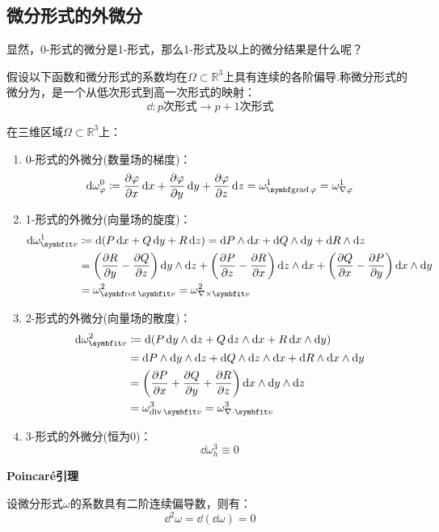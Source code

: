 \subsection{微分形式的外微分}
显然，0-形式的微分是1-形式，那么1-形式及以上的微分结果是什么呢？
\begin{definition}
    假设以下函数和微分形式的系数均在$\Omega\subset\mathbb{R}^3$上具有连续的各阶偏导.称微分形式的微分为，是一个从低次形式到高一次形式的映射：
    \[\dd: p\text{次形式}\to p+1\text{次形式}\]
\end{definition}
在三维区域$\Omega\subset\mathbb{R}^3$上：
\begin{enumerate}[circ]
    \item 0-形式的外微分(数量场的梯度)：
    \[\dd{\omega^0_\varphi} \coloneq \pdv{\varphi}{x}\dd{x} + \pdv{\varphi}{y}\dd{y} + \pdv{\varphi}{z}\dd{z} = \omega^1_{\grad\varphi} = \omega^1_{\nabla\varphi}\]
    \item 1-形式的外微分(向量场的旋度)：
    \begin{align*}
        \dd{\omega^1_{\vb{v}}} &\coloneq \dd{(P\dd{x}+Q\dd{y}+R\dd{z})} = \dd{P}\wedge\dd{x} + \dd{Q}\wedge\dd{y} + \dd{R}\wedge\dd{z} \\
        &= \left(\pdv{R}{y}-\pdv{Q}{z}\right)\dd{y}\wedge\dd{z} + \left(\pdv{P}{z}-\pdv{R}{x}\right)\dd{z}\wedge\dd{x} + \left(\pdv{Q}{x}-\pdv{P}{y}\right)\dd{x}\wedge\dd{y} \\
        &= \omega^2_{\rot\vb{v}} = \omega^2_{\nabla\times\vb{v}}
    \end{align*}
    \item 2-形式的外微分(向量场的散度)：
    \begin{align*}
        \dd{\omega^2_{\vb{v}}} &\coloneq \dd{(P\dd{y}\wedge\dd{z} + Q\dd{z}\wedge\dd{x} + R\dd{x}\wedge\dd{y})} \\
        &= \dd{P}\wedge\dd{y}\wedge\dd{z} + \dd{Q}\wedge\dd{z}\wedge\dd{x} + \dd{R}\wedge\dd{x}\wedge\dd{y} \\
        &= \left(\pdv{P}{x} + \pdv{Q}{y} + \pdv{R}{z}\right)\dd{x}\wedge\dd{y}\wedge\dd{z} \\
        &= \omega^3_{\operatorname{div}\vb{v}} = \omega^3_{\nabla\cdot\vb{v}}
    \end{align*}
    \item 3-形式的外微分(恒为0)：
    \[\dd{\omega^3_h} \equiv 0\]
\end{enumerate}

\begin{lemma}
    \textbf{Poincaré引理}

    设微分形式$\omega$的系数具有二阶连续偏导数，则有：
    \[\dd^2\omega = \dd{(\dd{\omega})} = 0\]
\end{lemma}

